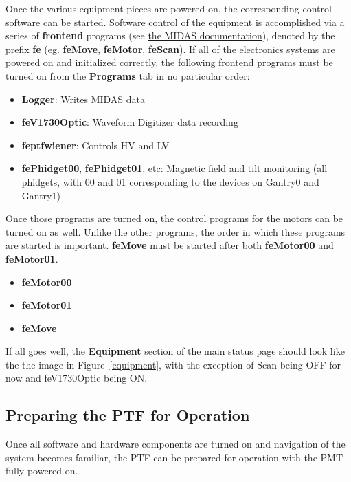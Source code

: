 \documentclass[twoside,letterpaper]{refart}
\begin{document}
Once the various equipment pieces are powered on, the corresponding control software can be started. Software control of the equipment is accomplished via a series of \textbf{frontend} programs (see \href{https://midas.triumf.ca/MidasWiki/index.php/Frontend_Application}{the MIDAS documentation}), denoted by the prefix \textbf{fe} (eg. \textbf{feMove}, \textbf{feMotor}, \textbf{feScan}). If all of the electronics systems are powered on and initialized correctly, the following frontend programs must be turned on from the \textbf{Programs} tab in no particular order:

\begin{itemize}
	
	\item \textbf{Logger}: Writes MIDAS data
	\item \textbf{feV1730Optic}: Waveform Digitizer data recording
	\item \textbf{feptfwiener}: Controls HV and LV
	\item \textbf{fePhidget00}, \textbf{fePhidget01}, etc: Magnetic field and tilt monitoring (all phidgets, with 00 and 01 corresponding to the devices on Gantry0 and Gantry1)
	
\end{itemize}

Once those programs are turned on, the control programs for the motors can be turned on as well. Unlike the other programs, the order in which these programs are started is important. \textbf{feMove} must be started after both \textbf{feMotor00} and \textbf{feMotor01}.

\begin{itemize}
	
	\item \textbf{feMotor00}
	\item \textbf{feMotor01}
	\item \textbf{feMove}
	
\end{itemize}

If all goes well, the \textbf{Equipment} section of the main status page should look like the the image in Figure~\ref{equipment}, with the exception of Scan being OFF for now and feV1730Optic being ON.

\subsection{Preparing the PTF for Operation}

Once all software and hardware components are turned on and navigation of the system becomes familiar, the PTF can be prepared for operation with the PMT fully powered on.
\end{document}

